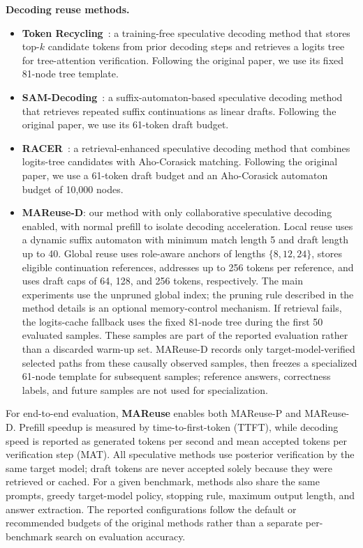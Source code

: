 \documentclass[letterpaper]{article} %
\begin{document}
\noindent\textbf{Decoding reuse methods.}
\begin{itemize}
    \item \textbf{Token Recycling}~\citep{DBLP:conf/acl/LuoWZZZ0X25}: a training-free speculative decoding method that stores top-$k$ candidate tokens from prior decoding steps and retrieves a logits tree for tree-attention verification. Following the original paper, we use its fixed 81-node tree template.
    \item \textbf{SAM-Decoding}~\citep{DBLP:conf/acl/HuWZZLCZ25}: a suffix-automaton-based speculative decoding method that retrieves repeated suffix continuations as linear drafts. Following the original paper, we use its 61-token draft budget.
    \item \textbf{RACER}~\citep{DBLP:conf/acl/ZhangLZWZ26}: a retrieval-enhanced speculative decoding method that combines logits-tree candidates with Aho-Corasick matching. Following the original paper, we use a 61-token draft budget and an Aho-Corasick automaton budget of 10,000 nodes.
	\item \textbf{MAReuse-D}: our method with only collaborative speculative decoding enabled, with normal prefill to isolate decoding acceleration. Local reuse uses a dynamic suffix automaton with minimum match length 5 and draft length up to 40. Global reuse uses role-aware anchors of lengths $\{8,12,24\}$, stores eligible continuation references, addresses up to 256 tokens per reference, and uses draft caps of 64, 128, and 256 tokens, respectively. The main experiments use the unpruned global index; the pruning rule described in the method details is an optional memory-control mechanism. If retrieval fails, the logits-cache fallback uses the fixed 81-node tree during the first 50 evaluated samples. These samples are part of the reported evaluation rather than a discarded warm-up set. MAReuse-D records only target-model-verified selected paths from these causally observed samples, then freezes a specialized 61-node template for subsequent samples; reference answers, correctness labels, and future samples are not used for specialization.
\end{itemize}

For end-to-end evaluation, \textbf{MAReuse} enables both MAReuse-P and MAReuse-D. Prefill speedup is measured by time-to-first-token (TTFT), while decoding speed is reported as generated tokens per second and mean accepted tokens per verification step (MAT). All speculative methods use posterior verification by the same target model; draft tokens are never accepted solely because they were retrieved or cached. For a given benchmark, methods also share the same prompts, greedy target-model policy, stopping rule, maximum output length, and answer extraction. The reported configurations follow the default or recommended budgets of the original methods rather than a separate per-benchmark search on evaluation accuracy.
\end{document}
